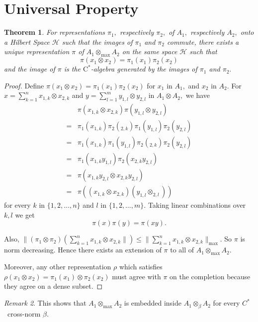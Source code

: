 \documentclass{article}
\theoremstyle{plain}
\newtheorem{theorem}{Theorem}[section]
\theoremstyle{definition}
\theoremstyle{remark}
\newtheorem{remark}[theorem]{Remark}
\begin{document}
\section{Universal Property}
\begin{theorem}
    For representations $\pi_1,$ respectively $\pi_2,$ of $A_1,$ respectively $A_2,$ onto a Hilbert Space $\mathcal{H}$
    such that the images of $\pi_1$ and $\pi_2$ commute, there exists a unique representation $\pi$ of $A_1 \otimes_{\max}
    A_2$ on the same space $\mathcal{H}$ such that
    $$\pi(x_1 \otimes x_2) = \pi_1(x_1) \pi_2(x_2)$$
    and the image of $\pi$ is the $\text{C}^\ast$\nobreakdash-algebra generated by the images of $\pi_1$ and $\pi_2.$
\end{theorem}
\begin{proof}
	Define $\pi(x_1 \otimes x_2) = \pi_1(x_1) \pi_2(x_2)$ for $x_1$ in $A_1,$ and $x_2$ in $A_2.$
	For $x = \sum_{k=1}^{n} x_{1,k} \otimes x_{2,k}$ and $y = \sum_{l=1}^{m} y_{1,l} \otimes y_{2,l}$
	in $A_1 \otimes A_2,$ we have
	\begin{align*}
		{}& \pi(x_{1,k} \otimes x_{2,k}) \pi(y_{1,l} \otimes y_{2,l}) \\
		={}& \pi_1(x_{1,k}) \pi_2(_{2,k}) \pi_1(y_{1,l}) \pi_2(y_{2,l}) \\
		={}& \pi_1(x_{1,k}) \pi_1(y_{1,l}) \pi_2(_{2,k}) \pi_2(y_{2,l}) \\
		={}& \pi_1(x_{1,k} y_{1,l}) \pi_2(x_{2,k} y_{2,l}) \\
		={}& \pi(x_{1,k} y_{2,l} \otimes x_{2,k} y_{2,l} ) \\
		={}& \pi( (x_{1,k} \otimes x_{2,k}) ( y_{1,l} \otimes _{2,l} ))
	\end{align*}
	for every $k$ in $\{1,2,\dotsc, n\}$ and $l$ in $\{1, 2, \dotsc, m\}.$
	Taking linear combinations over $k,l$ we get
	$$\pi(x) \pi(y) = \pi(xy).$$

	Also, $\lVert (\pi_1 \otimes \pi_2) (\sum_{k=1}^{n} x_{1,k} \otimes x_{2,k} \rVert) \leq 
	\lVert \sum_{k=1}^{n} x_{1,k} \otimes x_{2,k} \rVert_{\max}.$ So $\pi$ is norm decreasing. Hence there
	exists an extension of $\pi$ to all of $A_1 \otimes_{\max} A_2.$

Moreover, any other representation $\rho$ which satisfies $\rho(x_1 \otimes x_2) = \pi_1(x_1) \otimes \pi_2(x_2)$ must agree
with $\pi$ on the completion because they agree on a dense subset.
\end{proof}

\begin{remark}
	This shows that $A_1 \otimes_{\max} A_2$ is embedded inside $A_1 \otimes_\beta A_2$ for every $C^\ast$~cross\nobreakdash-norm $\beta.$
\end{remark}
\end{document}
